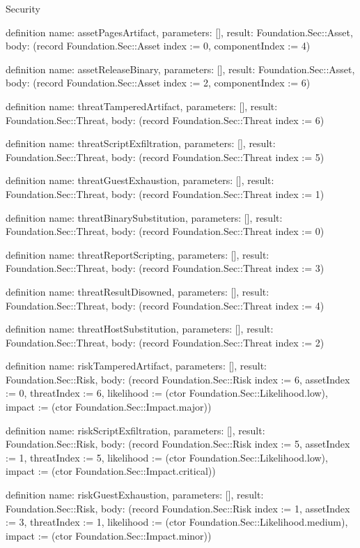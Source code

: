 \begin{lexlean}{Security}
\begin{semanticmodule}
definition{
  name: assetPagesArtifact,
  parameters: [],
  result: Foundation.Sec::Asset,
  body: (record Foundation.Sec::Asset {index := 0, componentIndex := 4})
}

definition{
  name: assetReleaseBinary,
  parameters: [],
  result: Foundation.Sec::Asset,
  body: (record Foundation.Sec::Asset {index := 2, componentIndex := 6})
}

definition{
  name: threatTamperedArtifact,
  parameters: [],
  result: Foundation.Sec::Threat,
  body: (record Foundation.Sec::Threat {index := 6})
}

definition{
  name: threatScriptExfiltration,
  parameters: [],
  result: Foundation.Sec::Threat,
  body: (record Foundation.Sec::Threat {index := 5})
}

definition{
  name: threatGuestExhaustion,
  parameters: [],
  result: Foundation.Sec::Threat,
  body: (record Foundation.Sec::Threat {index := 1})
}

definition{
  name: threatBinarySubstitution,
  parameters: [],
  result: Foundation.Sec::Threat,
  body: (record Foundation.Sec::Threat {index := 0})
}

definition{
  name: threatReportScripting,
  parameters: [],
  result: Foundation.Sec::Threat,
  body: (record Foundation.Sec::Threat {index := 3})
}

definition{
  name: threatResultDisowned,
  parameters: [],
  result: Foundation.Sec::Threat,
  body: (record Foundation.Sec::Threat {index := 4})
}

definition{
  name: threatHostSubstitution,
  parameters: [],
  result: Foundation.Sec::Threat,
  body: (record Foundation.Sec::Threat {index := 2})
}

definition{
  name: riskTamperedArtifact,
  parameters: [],
  result: Foundation.Sec::Risk,
  body: (record Foundation.Sec::Risk {index := 6, assetIndex := 0, threatIndex := 6, likelihood := (ctor Foundation.Sec::Likelihood.low), impact := (ctor Foundation.Sec::Impact.major)})
}

definition{
  name: riskScriptExfiltration,
  parameters: [],
  result: Foundation.Sec::Risk,
  body: (record Foundation.Sec::Risk {index := 5, assetIndex := 1, threatIndex := 5, likelihood := (ctor Foundation.Sec::Likelihood.low), impact := (ctor Foundation.Sec::Impact.critical)})
}

definition{
  name: riskGuestExhaustion,
  parameters: [],
  result: Foundation.Sec::Risk,
  body: (record Foundation.Sec::Risk {index := 1, assetIndex := 3, threatIndex := 1, likelihood := (ctor Foundation.Sec::Likelihood.medium), impact := (ctor Foundation.Sec::Impact.minor)})
}


\end{semanticmodule}
\end{lexlean}
